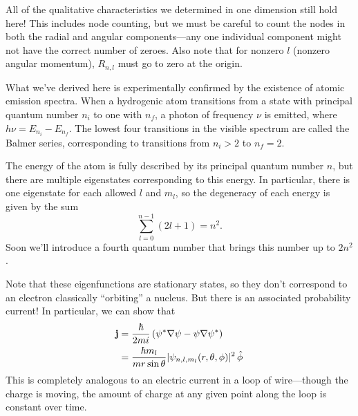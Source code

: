 \documentclass[../p052main.tex]{subfiles}
\begin{document}
All of the qualitative characteristics we determined in one dimension still hold here!
This includes node counting, but we must be careful to count the nodes in both the radial and angular components---any one individual component might not have the correct number of zeroes.
Also note that for nonzero $l$ (nonzero angular momentum), $R_{n,l}$ must go to zero at the origin.

What we've derived here is experimentally confirmed by the existence of atomic emission spectra.
When a hydrogenic atom transitions from a state with principal quantum number $n_i$ to one with $n_f$, a photon of frequency $\nu$ is emitted, where $h\nu = E_{n_i} - E_{n_f}$.
The lowest four transitions in the visible spectrum are called the Balmer series, corresponding to transitions from $n_i > 2$ to $n_f = 2$.

The energy of the atom is fully described by its principal quantum number $n$, but there are multiple eigenstates corresponding to this energy.
In particular, there is one eigenstate for each allowed $l$ and $m_l$, so the degeneracy of each energy is given by the sum
\[ \sum_{l=0}^{n-1} (2l + 1) = n^2. \]
Soon we'll introduce a fourth quantum number that brings this number up to $2n^2$.

Note that these eigenfunctions are stationary states, so they don't correspond to an electron classically ``orbiting'' a nucleus.
But there is an associated probability current!
In particular, we can show that
\begin{align*}
    \mathbf{j} &= \frac{\hbar}{2mi} \left( \psi^* \nabla \psi - \psi \nabla \psi^* \right) \\
    &= \frac{\hbar m_l}{mr \sin \theta} |\psi_{n,l,m_l}(r,\theta,\phi)|^2 \,\hat\phi
\end{align*}
This is completely analogous to an electric current in a loop of wire---though the charge is moving, the amount of charge at any given point along the loop is constant over time.
\end{document}
